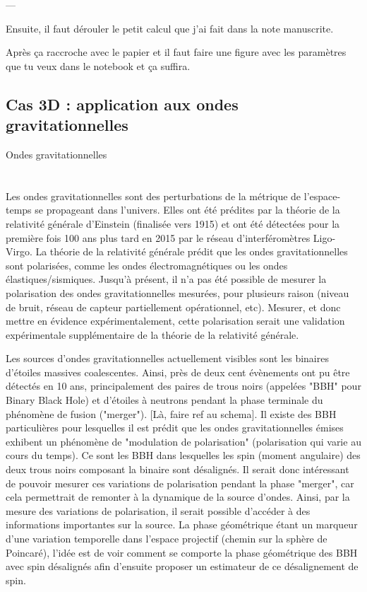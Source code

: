 ---


Ensuite, il faut dérouler le petit calcul que j'ai fait dans la note manuscrite. 

Après ça raccroche avec le papier et il faut faire une figure avec les paramètres que tu veux dans le notebook et ça suffira. 



\subsection{\todo Cas 3D : application aux ondes gravitationnelles} \label{subsec:ex-3D}

Ondes gravitationnelles
\\ \\ \\
Les ondes gravitationnelles sont des perturbations de la métrique de l'espace-temps se propageant dans l'univers. Elles ont été prédites par la théorie de la relativité générale d'Einstein (finalisée vers 1915) et ont été détectées pour la première fois 100 ans plus tard en 2015 par le réseau d'interféromètres Ligo-Virgo. La théorie de la relativité générale prédit que les ondes gravitationnelles sont polarisées, comme les ondes électromagnétiques ou les ondes élastiques/sismiques. Jusqu'à présent, il n'a pas été possible de mesurer la polarisation des ondes gravitationnelles mesurées, pour plusieurs raison (niveau de bruit, réseau de capteur partiellement opérationnel, etc). Mesurer, et donc mettre en évidence expérimentalement, cette polarisation serait une validation expérimentale supplémentaire de la théorie de la relativité générale.

Les sources d'ondes gravitationnelles actuellement visibles sont les binaires d'étoiles massives coalescentes. Ainsi, près de deux cent évènements ont pu être détectés en 10 ans, principalement des paires de trous noirs (appelées "BBH" pour Binary Black Hole) et d'étoiles à neutrons pendant la phase terminale du phénomène de fusion ("merger"). [Là, faire ref au schema]. Il existe des BBH particulières pour lesquelles il est prédit que les ondes gravitationnelles émises exhibent un phénomène de "modulation de polarisation" (polarisation qui varie au cours du temps). Ce sont les BBH dans lesquelles les spin (moment angulaire) des deux trous noirs composant la binaire sont désalignés. Il serait donc intéressant de pouvoir mesurer ces variations de polarisation pendant la phase "merger", car cela permettrait de remonter à la dynamique de la source d'ondes. Ainsi, par la mesure des variations de polarisation, il serait possible d'accéder à des informations importantes sur la source. La phase géométrique étant un marqueur d'une variation temporelle dans l'espace projectif (chemin sur la sphère de Poincaré), l'idée est de voir comment se comporte la phase géométrique des BBH avec spin désalignés afin d'ensuite proposer un estimateur de ce désalignement de spin. 

